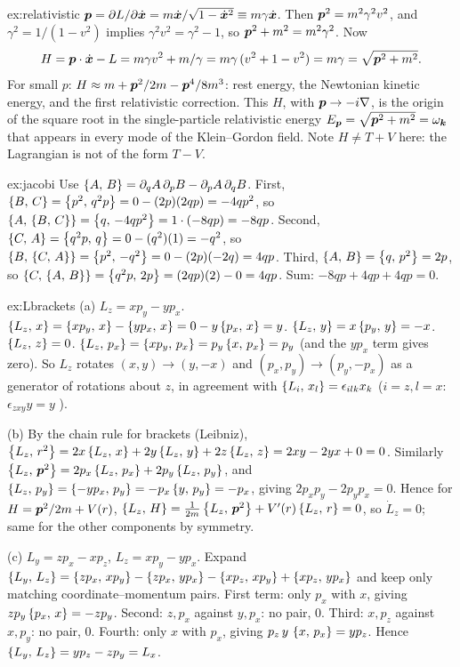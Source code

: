 \documentclass[11pt]{article}
\begin{document}
\begin{solution}{ex:relativistic}
$\bm{p}=\partial L/\partial\dot{\bm{x}}=m\dot{\bm{x}}/\sqrt{1-\dot{\bm{x}}^2}\equiv m\gamma\dot{\bm{x}}$. Then $\bm{p}^2=m^2\gamma^2v^2$, and $\gamma^2=1/(1-v^2)$ implies $\gamma^2v^2=\gamma^2-1$, so $\bm{p}^2+m^2=m^2\gamma^2$. Now
\[
 H=\bm{p}\cdot\dot{\bm{x}}-L=m\gamma v^2+m/\gamma=m\gamma\,(v^2+1-v^2)=m\gamma=\sqrt{\bm{p}^2+m^2}.
\]
For small $p$: $H\approx m+\bm{p}^2/2m-\bm{p}^4/8m^3$: rest energy, the Newtonian kinetic energy, and the first relativistic correction. This $H$, with $\bm{p}\to-i\nabla$, is the origin of the square root in the single-particle relativistic energy $E_{\bm{p}}=\sqrt{\bm{p}^2+m^2}=\omega_{\bm{k}}$ that appears in every mode of the Klein--Gordon field. Note $H\neq T+V$ here: the Lagrangian is not of the form $T-V$.
\end{solution}

\begin{solution}{ex:jacobi}
Use $\left\{A,\,B\right\}=\partial_qA\,\partial_pB-\partial_pA\,\partial_qB$.
First, $\left\{B,\,C\right\}=\left\{p^2,\,q^2p\right\}=0-(2p)(2qp)=-4qp^2$, so $\left\{A,\,\left\{B,\,C\right\}\right\}=\left\{q,\,-4qp^2\right\}=1\cdot(-8qp)=-8qp$.
Second, $\left\{C,\,A\right\}=\left\{q^2p,\,q\right\}=0-(q^2)(1)=-q^2$, so $\left\{B,\,\left\{C,\,A\right\}\right\}=\left\{p^2,\,-q^2\right\}=0-(2p)(-2q)=4qp$.
Third, $\left\{A,\,B\right\}=\left\{q,\,p^2\right\}=2p$, so $\left\{C,\,\left\{A,\,B\right\}\right\}=\left\{q^2p,\,2p\right\}=(2qp)(2)-0=4qp$.
Sum: $-8qp+4qp+4qp=0$. \checkmark
\end{solution}

\begin{solution}{ex:Lbrackets}
(a) $L_z=xp_y-yp_x$. $\left\{L_z,\,x\right\}=\left\{xp_y,\,x\right\}-\left\{yp_x,\,x\right\}=0-y\left\{p_x,\,x\right\}=y$. $\left\{L_z,\,y\right\}=x\left\{p_y,\,y\right\}=-x$. $\left\{L_z,\,z\right\}=0$. $\left\{L_z,\,p_x\right\}=\left\{xp_y,\,p_x\right\}=p_y\left\{x,\,p_x\right\}=p_y$ (and the $yp_x$ term gives zero). So $L_z$ rotates $(x,y)\to(y,-x)$ and $(p_x,p_y)\to(p_y,-p_x)$ as a generator of rotations about $z$, in agreement with $\left\{L_i,\,x_l\right\}=\epsilon_{ilk}x_k$ ($i=z,l=x$: $\epsilon_{zxy}y=y$ \checkmark).

(b) By the chain rule for brackets (Leibniz), $\left\{L_z,\,r^2\right\}=2x\left\{L_z,\,x\right\}+2y\left\{L_z,\,y\right\}+2z\left\{L_z,\,z\right\}=2xy-2yx+0=0$. Similarly $\left\{L_z,\,\bm{p}^2\right\}=2p_x\left\{L_z,\,p_x\right\}+2p_y\left\{L_z,\,p_y\right\}$, and $\left\{L_z,\,p_y\right\}=\left\{-yp_x,\,p_y\right\}=-p_x\left\{y,\,p_y\right\}=-p_x$, giving $2p_xp_y-2p_yp_x=0$. Hence for $H=\bm{p}^2/2m+V(r)$, $\left\{L_z,\,H\right\}=\frac1{2m}\left\{L_z,\,\bm{p}^2\right\}+V'(r)\left\{L_z,\,r\right\}=0$, so $\dot L_z=0$; same for the other components by symmetry.

(c) $L_y=zp_x-xp_z$, $L_z=xp_y-yp_x$. Expand $\left\{L_y,\,L_z\right\}=\left\{zp_x,\,xp_y\right\}-\left\{zp_x,\,yp_x\right\}-\left\{xp_z,\,xp_y\right\}+\left\{xp_z,\,yp_x\right\}$ and keep only matching coordinate--momentum pairs. First term: only $p_x$ with $x$, giving $zp_y\left\{p_x,\,x\right\}=-zp_y$. Second: $z,p_x$ against $y,p_x$: no pair, $0$. Third: $x,p_z$ against $x,p_y$: no pair, $0$. Fourth: only $x$ with $p_x$, giving $p_z\,y\,\left\{x,\,p_x\right\}=yp_z$. Hence $\left\{L_y,\,L_z\right\}=yp_z-zp_y=L_x$. \checkmark
\end{solution}
\end{document}
